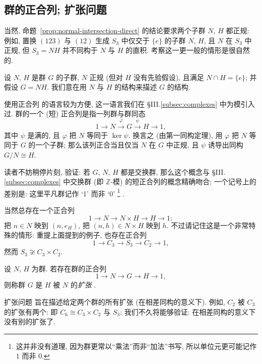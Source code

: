 \subsection{群的正合列; 扩张问题}
\label{subsec:exact-sequences}

当然, 命题~\ref{prop:normal-intersection-direct} 的结论要求两个子群 $N$, $H$ 都正规: 例如, 置换 $(123)$ 与 $(12)$ 生成 $S_3$ 中仅交于 $\{e\}$ 的子群 $N$, $H$, 且 $N$ 在 $S_3$ 中正规, 但 $S_3 = NH$ 并不同构于 $N$ 与 $H$ 的直积. 考察这一更一般的情形是很自然的.

设 $N$, $H$ 是群 $G$ 的子群, $N$ 正规 (但对 $H$ 没有先验假设), 且满足 $N \cap H = \{e\}$; 并假设 $G = NH$. 我们意在用 $N$ 与 $H$ 的结构来描述 $G$ 的结构.

使用正合列%
%
的语言较为方便, 这一语言我们在 \S III.\ref{subsec:complexes} 中为模引入过. 群的一个 (短) 正合列是指一列群与群同态
\[
1 \longrightarrow N \stackrel{\varphi}{\longrightarrow} G \stackrel{\psi}{\longrightarrow} H \longrightarrow 1,
\]
其中 $\psi$ 是满的, 且 $\varphi$ 把 $N$ 等同于 $\ker \psi$. 换言之 (由第一同构定理), 用 $\varphi$ 把 $N$ 等同于 $G$ 的一个子群; 那么该列正合当且仅当 $N$ 在 $G$ 中正规, 且 $\psi$ 诱导出同构 $G/N \cong H$.

读者不妨稍停片刻, 验证: 若 $G$, $N$, $H$ 都是交换群, 那么这个概念与 \S III.\ref{subsec:complexes} 中交换群 (即 $\mathbb{Z}$-模) 的短正合列的概念精确吻合; 一个记号上的差别是: 这里平凡群记作 `1' 而非 `0'%
\footnote{这并非没有道理, 因为群更常以``乘法''而非``加法''书写, 所以单位元更可能记作 $1$ 而非 $0$.}%
.

当然总存在一个正合列
\[
1 \longrightarrow N \longrightarrow N \times H \longrightarrow H \longrightarrow 1:
\]
把 $n \in N$ 映到 $(n, e_H)$, 把 $(n, h) \in N \times H$ 映到 $h$. 不过请记住这是一个非常特殊的情形: 重提上面提到的例子, 也存在正合列
\[
1 \longrightarrow C_3 \longrightarrow S_3 \longrightarrow C_2 \longrightarrow 1,
\]
然而 $S_3 \not\cong C_3 \times C_2$.

\begin{definition}
\label{def:extension}
设 $N$, $H$ 为群. 若存在群的正合列
\[
1 \longrightarrow N \longrightarrow G \longrightarrow H \longrightarrow 1,
\]
则称群 $G$ 是 $H$ 被 $N$ 的\emph{扩张}%
%
.
\end{definition}

扩张问题%
旨在描述给定两个群的所有扩张 (在相差同构的意义下). 例如, $C_2$ 被 $C_3$ 的扩张有两个: 即 $C_6 \cong C_3 \times C_2$ 与 $S_3$; 我们不久将能够验证: 在相差同构的意义下没有别的扩张了.

